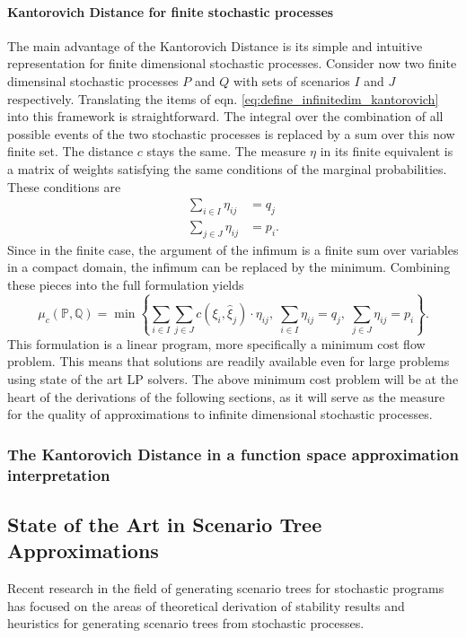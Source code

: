 \documentclass[a4paper, 12pt] {article}
\begin{document}
\paragraph{Kantorovich Distance for finite stochastic processes} The main advantage of the Kantorovich Distance is its simple and intuitive representation for finite dimensional stochastic processes. Consider now two finite dimensinal stochastic processes $P$ and $Q$ with sets of scenarios $I$ and $J$ respectively. Translating the items of eqn. \ref{eq:define_infinitedim_kantorovich} into this framework is straightforward. The integral over the combination of all possible events of the two stochastic processes is replaced by a sum over this now finite set. The distance $c$ stays the same. The measure $\eta$ in its finite equivalent is a matrix of weights satisfying the same conditions of the marginal probabilities. These conditions are
\begin{align}
  \label{eq:finitedim-marginals-eta}
  \sum_{i\in I} \eta_{ij} &= q_j\\
  \sum_{j\in J} \eta_{ij} &= p_i.
\end{align}
Since in the finite case, the argument of the infimum is a finite sum over variables in a compact domain, the infimum can be replaced by the minimum. Combining these pieces into the full formulation yields
\begin{equation}
  \label{eq:define-finitedim-Kantorovich}
  \mu_c(\mathbb{P}, \mathbb{Q}) = \min\left\{\sum_{i\in I}\sum_{j\in J}c(\xi_i,\hat{\xi}_j)\cdot \eta_{ij},\; \sum_{i\in I}\eta_{ij}=q_j,\;\sum_{j\in J}\eta_{ij}=p_i\right\}.
\end{equation}
This formulation is a linear program, more specifically a minimum cost flow problem. This means that solutions are readily available even for large problems using state of the art LP solvers. The above minimum cost problem will be at the heart of the derivations of the following sections, as it will serve as the measure for the quality of approximations to infinite dimensional stochastic processes.
\subsubsection{The Kantorovich Distance in a function space approximation interpretation}
\subsection{State of the Art in Scenario Tree Approximations}
Recent research in the field of generating scenario trees for stochastic programs has focused on the areas of theoretical derivation of stability results and heuristics for generating scenario trees from stochastic processes. 
\end{document}
